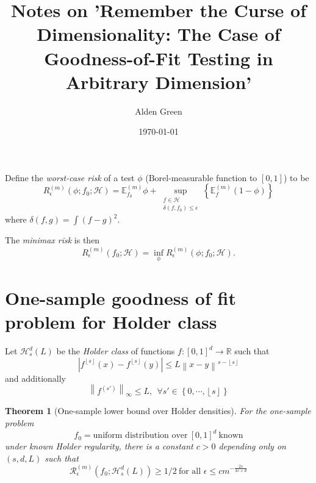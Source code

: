 \documentclass{article}
\newcommand{\Reals}{\mathbb{R}}
\newcommand{\norm}[1]{\left\lVert#1\right\rVert}
\newcommand{\abs}[1]{\left \lvert #1 \right \rvert}
\newcommand{\set}[1]{\left\{#1\right\}}
\newcommand{\floor}[1]{\left\lfloor #1 \right\rfloor}
\newcommand{\1}{\mathbb{I}}
\newcommand{\R}{\mathcal{R}}
\newcommand{\Hclass}{\mathcal{H}}
\newcommand{\Ebb}{\mathbb{E}}
\theoremstyle{alden}
\theoremstyle{aldenthm}
\newtheorem{theorem}{Theorem}
\theoremstyle{definition}
\theoremstyle{remark}
\begin{document}
	
\title{Notes on 'Remember the Curse of Dimensionality: The Case of Goodness-of-Fit Testing in Arbitrary Dimension'}
\author{Alden Green}
\date{\today}
\maketitle

Define the \emph{worst-case risk} of a test $\phi$ (Borel-measurable function to $[0,1]$) to be
\begin{equation*}
R_{\epsilon}^{(m)}(\phi; f_0; \mathcal{H}) = \Ebb_{f_0}^{(m)} \phi + \sup_{\substack{f \in \Hclass \\ \delta(f,f_0) \leq \epsilon}} \set{\Ebb_f^{(m)} ( 1 - \phi)}
\end{equation*}
where $\delta(f,g) = \int (f-g)^2$.

The \emph{minimax risk} is then
\begin{equation*}
R_{\epsilon}^{(m)}(f_0; \mathcal{H}) = \inf_{\phi} R_{\epsilon}^{(m)}(\phi; f_0; \mathcal{H}).
\end{equation*}

\section{One-sample goodness of fit problem for Holder class}

Let $\Hclass_s^d(L)$ be the \emph{Holder class} of functions $f: [0,1]^d \to \Reals$ such that
\begin{equation*}
\abs{f^{\floor{s}}(x) - f^{\floor{s}}(y)} \leq L \norm{x - y}^{s - \floor{s}} \tag{for all $x,y \in [0,1]^d$}
\end{equation*}
and additionally
\begin{equation*}
\norm{f^{(s')}}_{\infty} \leq L,~~ \forall s' \in \set{0,\cdots,\floor{s}}
\end{equation*}

\begin{theorem}[One-sample lower bound over Holder densities]
	\label{thm: one_sample_Holder_lower_bound}
	For the one-sample problem
	\begin{equation*}
	f_0 = \text{uniform distribution over} ~[0,1]^d~ \text{known}
	\end{equation*}
	under known Holder regularity, there is a constant $c > 0$ depending only on $(s,d,L)$ such that
	\begin{equation*}
	\R_{\epsilon}^{(m)}(f_0; \Hclass_s^d(L)) \geq 1/2~ \text{for all $\epsilon \leq cm^{-\frac{2s}{4s + d}}$}
	\end{equation*}
\end{theorem}
\end{document}
